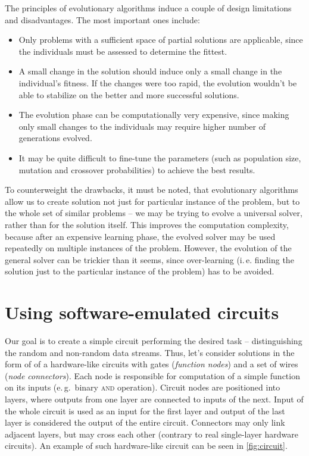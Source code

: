 \documentclass[12pt,oneside]{fithesis2}
\begin{document}
\noindent
The principles of evolutionary algorithms induce a couple of design limitations and disadvantages. 
The most important ones include:
\begin{itemize} \rightskip=2em
\item Only problems with a sufficient space of partial solutions are applicable, since the individuals must be assessed 
to determine the fittest.
\item A small change in the solution should induce only a small change in the individual's fitness. If the changes were
too rapid, the evolution wouldn't be able to stabilize on the better and more successful solutions.
\item The evolution phase can be computationally very expensive, since making only small changes to the individuals may require
higher number of generations evolved.
\item It may be quite difficult to fine-tune the parameters (such as population size, mutation and crossover probabilities)
to achieve the best results.
\end{itemize}

\noindent
To counterweight the drawbacks, it must be noted, that evolutionary algorithms allow us to create solution not just for particular
instance of the problem, but to the whole set of similar problems -- we may be trying to evolve a universal solver, 
rather than for the solution itself. 
This improves the computation complexity, because after an expensive learning phase, the evolved solver may be used
repeatedly on multiple instances of the problem. However, the evolution of the general solver can be trickier than it seems,
since over-learning (i.\,e. finding the solution just to the particular instance of the problem) has to be avoided.

\section{Using software-emulated circuits}
\label{sec:sw-circuits}

Our goal is to create a simple circuit performing the desired task -- distinguishing the random and non-random data streams.
Thus, let's consider solutions in the form of of a hardware-like circuits with gates (\textit{function nodes}) 
and a set of wires (\textit{node connectors}).
Each node is responsible for computation of a simple function on its inputs (e.\,g.\ binary \textsc{and} operation).
Circuit nodes are positioned into layers, where outputs from one layer are connected to inputs of the next. Input of the whole
circuit is used as an input for the first layer and output of the last layer is considered the output of the entire circuit.
Connectors may only link adjacent layers, but may cross each other (contrary to real single-layer hardware circuits).
An example of such hardware-like circuit can be seen in \autoref{fig:circuit}.
\end{document}
